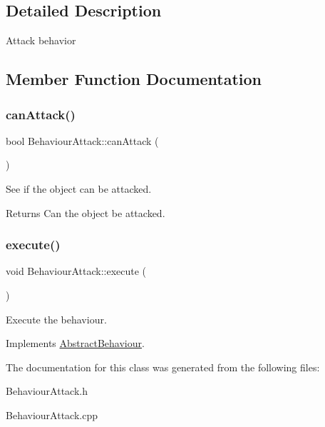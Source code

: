 \subsection{Detailed Description}
Attack behavior 



\subsection{Member Function Documentation}
\mbox{\label{class_behaviour_attack_a539f70f642f0b21a808631fc64fbf2d8}} 
\subsubsection{\texorpdfstring{can\+Attack()}{canAttack()}}
{\footnotesize\ttfamily bool Behaviour\+Attack\+::can\+Attack (\begin{DoxyParamCaption}{ }\end{DoxyParamCaption})}



See if the object can be attacked. 

\begin{DoxyReturn}{Returns}
Can the object be attacked.
\end{DoxyReturn}
\mbox{\label{class_behaviour_attack_aca669f46a6d32e5e41e7b477be1ee4cf}} 
\subsubsection{\texorpdfstring{execute()}{execute()}}
{\footnotesize\ttfamily void Behaviour\+Attack\+::execute (\begin{DoxyParamCaption}{ }\end{DoxyParamCaption})\hspace{0.3cm}{\ttfamily [virtual]}}



Execute the behaviour. 



Implements \mbox{\hyperlink{class_abstract_behaviour_ab99fb55a3b001e759e24d5b9721a742f}{Abstract\+Behaviour}}.



The documentation for this class was generated from the following files\+:\begin{DoxyCompactItemize}
\item 
Behaviour\+Attack.\+h\item 
Behaviour\+Attack.\+cpp\end{DoxyCompactItemize}
